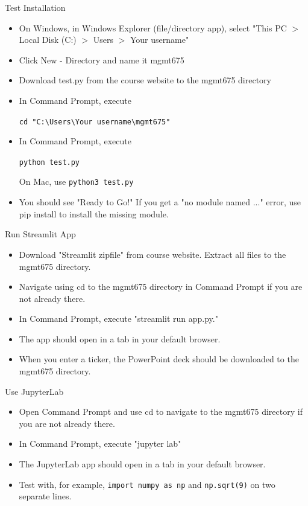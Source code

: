 \documentclass[10pt]{beamer}
\begin{document}
\begin{frame}{Test Installation}
\begin{itemize}
    \item On Windows, in Windows Explorer (file/directory app), select "This PC $>$ Local Disk (C:) $>$ Users $>$ Your username"
    \item Click New - Directory and name it mgmt675 
    \item Download test.py from the course website to the mgmt675 directory
    \item In Command Prompt, execute 
  
    \texttt{cd "C:\textbackslash Users\textbackslash Your username\textbackslash mgmt675" }

    \item In Command Prompt, execute 
   
    \texttt{python test.py}

  On Mac, use \texttt{python3 test.py}
    \item You should see "Ready to Go!"  If you get a "no module named ..." error, use pip install to install the missing module.
    \end{itemize}
\end{frame}

\begin{frame}{Run Streamlit App}
\begin{itemize}
    \item Download "Streamlit zipfile" from course website.  Extract all files to the mgmt675 directory.
    \item Navigate using cd to the mgmt675 directory in Command Prompt if you are not already there.
    \item In Command Prompt, execute "streamlit run app.py."
    \item The app should open in a tab in your default browser.
    \item When you enter a ticker, the PowerPoint deck should be downloaded to the mgmt675 directory.
\end{itemize}
\end{frame}

\begin{frame}{Use JupyterLab}
    \begin{itemize}
    \item Open Command Prompt and use cd to navigate to the mgmt675 directory if you are not already there.
    \item In Command Prompt, execute "jupyter lab"
    \item The JupyterLab app should open in a tab in your default browser.
    \item Test with, for example, \texttt{import numpy as np} and \texttt{np.sqrt(9)} on two separate lines.
    \end{itemize}
\end{frame}
\end{document}
